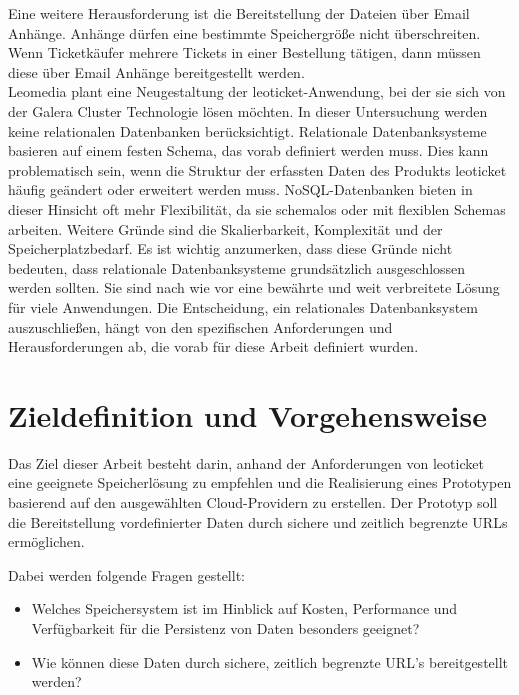 Eine weitere Herausforderung ist die Bereitstellung der Dateien über Email Anhänge. Anhänge dürfen eine bestimmte Speichergröße nicht überschreiten. Wenn Ticketkäufer mehrere Tickets in einer Bestellung tätigen, dann müssen diese über Email Anhänge bereitgestellt werden.\\

Leomedia plant eine Neugestaltung der leoticket-Anwendung, bei der sie sich von der Galera Cluster Technologie lösen möchten. In dieser Untersuchung werden keine relationalen Datenbanken berücksichtigt. Relationale Datenbanksysteme basieren auf einem festen Schema, das vorab definiert werden muss. Dies kann problematisch sein, wenn die Struktur der erfassten Daten des Produkts leoticket häufig geändert oder erweitert werden muss. NoSQL-Datenbanken bieten in dieser Hinsicht oft mehr Flexibilität, da sie schemalos oder mit flexiblen Schemas arbeiten. Weitere Gründe sind die Skalierbarkeit, Komplexität und der Speicherplatzbedarf. Es ist wichtig anzumerken, dass diese Gründe nicht bedeuten, dass relationale Datenbanksysteme grundsätzlich ausgeschlossen werden sollten. Sie sind nach wie vor eine bewährte und weit verbreitete Lösung für viele Anwendungen. Die Entscheidung, ein relationales Datenbanksystem auszuschließen, hängt von den spezifischen Anforderungen und Herausforderungen ab, die vorab für diese Arbeit definiert wurden.

\newpage

\section{Zieldefinition und Vorgehensweise}

Das Ziel dieser Arbeit besteht darin, anhand der Anforderungen von leoticket eine geeignete Speicherlösung zu empfehlen und die Realisierung eines Prototypen basierend auf den ausgewählten Cloud-Providern zu erstellen. Der Prototyp soll die Bereitstellung vordefinierter Daten durch sichere und zeitlich begrenzte URLs ermöglichen. 

Dabei werden folgende Fragen gestellt:

\begin{itemize}
	\item Welches Speichersystem ist im Hinblick auf Kosten, Performance und Verfügbarkeit für die Persistenz von Daten besonders geeignet? 
	\item Wie können diese Daten durch sichere, zeitlich begrenzte URL's bereitgestellt werden?
\end{itemize}

